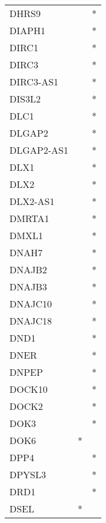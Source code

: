 \begin{longtable}{lcc}
DHRS9           &                &          * \\
DIAPH1          &                &          * \\
DIRC1           &                &          * \\
DIRC3           &                &          * \\
DIRC3-AS1       &                &          * \\
DIS3L2          &                &          * \\
DLC1            &                &          * \\
DLGAP2          &                &          * \\
DLGAP2-AS1      &                &          * \\
DLX1            &                &          * \\
DLX2            &                &          * \\
DLX2-AS1        &                &          * \\
DMRTA1          &                &          * \\
DMXL1           &                &          * \\
DNAH7           &                &          * \\
DNAJB2          &                &          * \\
DNAJB3          &                &          * \\
DNAJC10         &                &          * \\
DNAJC18         &                &          * \\
DND1            &                &          * \\
DNER            &                &          * \\
DNPEP           &                &          * \\
DOCK10          &                &          * \\
DOCK2           &                &          * \\
DOK3            &                &          * \\
DOK6            &              * &            \\
DPP4            &                &          * \\
DPYSL3          &                &          * \\
DRD1            &                &          * \\
DSEL            &              * &            \\

\end{longtable}
